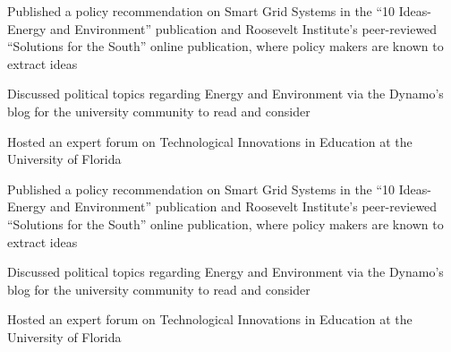 \documentclass[letterpaper]{article}
\begin{document}
\begin{compactitem}
	\item Published a policy recommendation on Smart Grid Systems in the “10 Ideas- Energy and Environment” publication and Roosevelt Institute’s peer-reviewed “Solutions for the South” online publication, where policy makers are known to extract ideas\\
	\item Discussed political topics regarding Energy and Environment via the Dynamo’s blog for the university community to read and consider\\
	\item Hosted an expert forum on Technological Innovations in Education at the University of Florida
\end{compactitem}

\begin{compactitem}
	\item Published a policy recommendation on Smart Grid Systems in the “10 Ideas- Energy and Environment” publication and Roosevelt Institute’s peer-reviewed “Solutions for the South” online publication, where policy makers are known to extract ideas\\
	\item Discussed political topics regarding Energy and Environment via the Dynamo’s blog for the university community to read and consider\\
	\item Hosted an expert forum on Technological Innovations in Education at the University of Florida
\end{compactitem}



\noindent{\Large\textbf {\\LEADERSHIP}}
\end{document}

